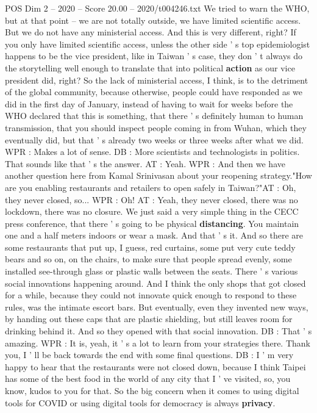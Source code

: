 \begin{textsample}{POS Dim 2 – 2020 – Score 20.00 – 2020/t004246.txt}
We tried to warn the WHO, but at that point -- we are not totally outside, we have limited scientific access.
But we do not have any ministerial access.
And this is very different, right?
If you only have limited scientific access, unless the other side ' s top epidemiologist happens to be the vice president, like in Taiwan ' s case, they don ' t always do the storytelling well enough to translate that into political \textbf{action} as our vice president did, right?
So the lack of ministerial access, I think, is to the detriment of the global community, because otherwise, people could have responded as we did in the first day of January, instead of having to wait for weeks before the WHO declared that this is something, that there ' s definitely human to human transmission, that you should inspect people coming in from Wuhan, which they eventually did, but that ' s already two weeks or three weeks after what we did.
WPR : Makes a lot of sense.
DB : More scientists and technologists in politics.
That sounds like that ' s the answer.
AT : Yeah.
WPR : And then we have another question here from Kamal Srinivasan about your reopening strategy."How are you enabling restaurants and retailers to open safely in Taiwan?"AT : Oh, they never closed, so...
WPR : Oh!
AT : Yeah, they never closed, there was no lockdown, there was no closure.
We just said a very simple thing in the CECC press conference, that there ' s going to be physical \textbf{distancing}.
You maintain one and a half meters indoors or wear a mask.
And that ' s it.
And so there are some restaurants that put up, I guess, red curtains, some put very cute teddy bears and so on, on the chairs, to make sure that people spread evenly, some installed see-through glass or plastic walls between the seats.
There ' s various social innovations happening around.
And I think the only shops that got closed for a while, because they could not innovate quick enough to respond to these rules, was the intimate escort bars.
But eventually, even they invented new ways, by handing out these caps that are plastic shielding, but still leaves room for drinking behind it.
And so they opened with that social innovation.
DB : That ' s amazing.
WPR : It is, yeah, it ' s a lot to learn from your strategies there.
Thank you, I ' ll be back towards the end with some final questions.
DB : I ' m very happy to hear that the restaurants were not closed down, because I think Taipei has some of the best food in the world of any city that I ' ve visited, so, you know, kudos to you for that.
So the big concern when it comes to using digital tools for COVID or using digital tools for democracy is always \textbf{privacy}.

\end{textsample}
